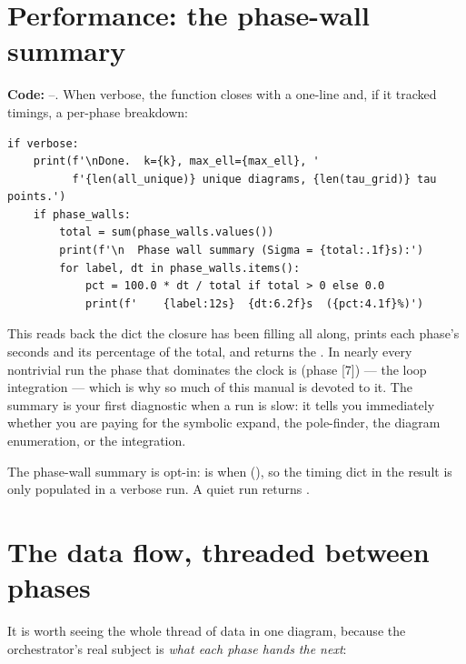 \section{Performance: the phase-wall summary}\label{sec:co-perf}

\textbf{Code:} --. When verbose, the
function closes with a one-line  and, if it tracked timings, a
per-phase breakdown:

\begin{lstlisting}
if verbose:
    print(f'\nDone.  k={k}, max_ell={max_ell}, '
          f'{len(all_unique)} unique diagrams, {len(tau_grid)} tau points.')
    if phase_walls:
        total = sum(phase_walls.values())
        print(f'\n  Phase wall summary (Sigma = {total:.1f}s):')
        for label, dt in phase_walls.items():
            pct = 100.0 * dt / total if total > 0 else 0.0
            print(f'    {label:12s}  {dt:6.2f}s  ({pct:4.1f}%)')
\end{lstlisting}

This reads back the  dict the  closure has
been filling all along, prints each phase's seconds and its percentage of the
total, and returns the . In nearly every nontrivial run the phase
that dominates the clock is  (phase [7]) --- the loop integration
--- which is why so much of this manual is devoted to it. The summary is your
first diagnostic when a run is slow: it tells you immediately whether you are
paying for the symbolic expand, the pole-finder, the diagram enumeration, or the
integration.

\begin{gotcha}
The phase-wall summary is opt-in:  is  when
 (), so the timing dict in the
result is only populated in a verbose run. A quiet run returns
.
\end{gotcha}

\section{The data flow, threaded between phases}\label{sec:co-dataflow}

It is worth seeing the whole thread of data in one diagram, because the
orchestrator's real subject is \emph{what each phase hands the next}:

